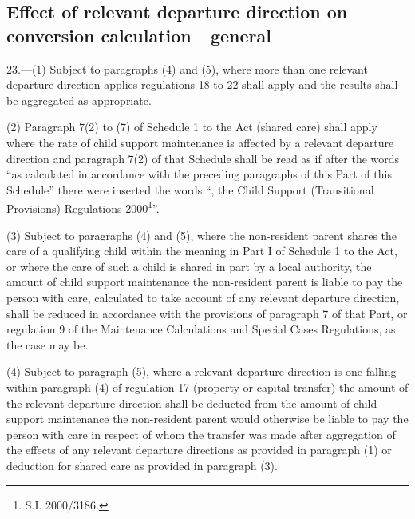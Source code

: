\documentclass[12pt,a4paper]{article}
\begin{document}

\subsection[23. Effect of relevant departure direction on conversion calculation—general]{Effect of relevant departure direction on conversion calculation—general}

23.---(1) Subject to paragraphs (4) and (5), where more than one relevant departure direction applies regulations 18 to 22 shall apply and the results shall be aggregated as appropriate.

(2) Paragraph 7(2) to (7) of Schedule 1 to the Act (shared care) shall apply where the rate of child support maintenance is affected by a relevant departure direction
and paragraph 7(2) of that Schedule shall be read as if after the words “as calculated in accordance with the preceding paragraphs of this Part of this Schedule” there were inserted the words “, the Child Support (Transitional Provisions) Regulations 2000\footnote{\frenchspacing S.I. 2000/3186.}”.

(3) Subject to paragraphs (4) and (5), where the non-resident parent shares the care of a qualifying child within the meaning in Part I of Schedule 1 to the Act, or where the care of such a child is shared in part by a local authority, the amount of child support maintenance the non-resident parent is liable to pay the person with care, calculated to take account of any relevant departure direction, shall be reduced in accordance with the provisions of paragraph 7 of that Part, or regulation 9 of the Maintenance Calculations and Special Cases Regulations, as the case may be.

(4) Subject to paragraph (5), where a relevant departure direction is one falling within paragraph (4) of regulation 17 (property or capital transfer) the amount of the relevant departure direction shall be deducted from the amount of child support maintenance the non-resident parent would otherwise be liable to pay the person with care in respect of whom the transfer was made after aggregation of the effects of any relevant departure directions as provided in paragraph (1) or deduction for shared care as provided in paragraph (3).
\end{document}

